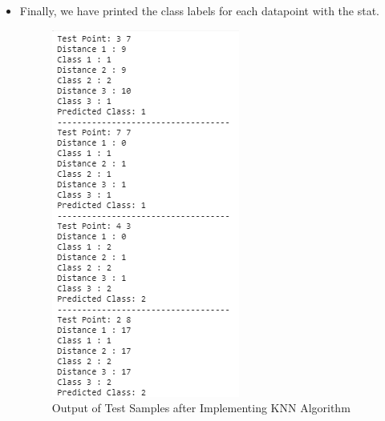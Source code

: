 \documentclass[conference]{IEEEtran}
\begin{document}
\begin{itemize}
\item Finally, we have printed the class labels for each datapoint with the stat. \\
\begin{figure}[htb!]
\centerline{\includegraphics[scale=0.9]{43.png}}
\caption{Output of Test Samples after Implementing KNN Algorithm\\}
\label{fig}
\end{figure}
\end{itemize}
\end{document}
